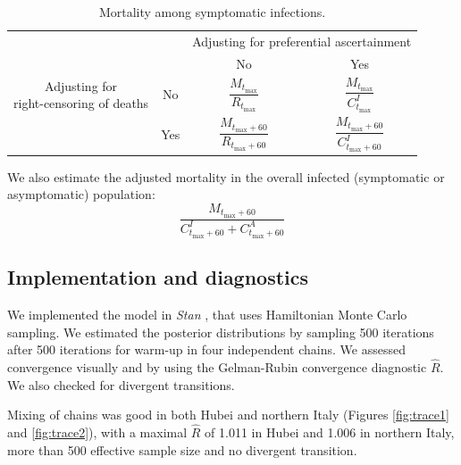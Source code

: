 \documentclass{article}
\begin{document}
\begin{table}[H]
		\centering
		\begin{tabular}{cc|cc}
			

		 & & \multicolumn{2}{c}{Adjusting for preferential ascertainment}\\
		 & & No & Yes \\[3pt]
		 \hline
		\multirowcell{3}{Adjusting for\\[2pt] right-censoring of deaths} & No & $\dfrac{ M_{t_{\text{max}}}}{ R_{t_{\text{max}}}}$ & $\dfrac{ M_{t_{\text{max}}}}{ C_{t_{\text{max}}}^{I}}$\\[20pt]
		& Yes & $\dfrac{ M_{t_{\text{max}}+60}}{ R_{t_{\text{max}}+60}}$ & $\dfrac{ M_{t_{\text{max}}+60}}{ C_{t_{\text{max}}+60}^{I}}$\\[10pt]

		\end{tabular}
		\caption{Mortality among symptomatic infections.}
		\label{tab_cfr}
\end{table}
We also estimate the adjusted mortality in the overall infected (symptomatic or asymptomatic) population:
\begin{equation}
\dfrac{ M_{t_{\text{max}}+60}}{ C_{t_{\text{max}}+60}^{I}+C_{t_{\text{max}}+60}^{A}}
\end{equation}	

\subsection{Implementation and diagnostics}
\label{diag}

We implemented the model in \textit{Stan} \cite{Carpenter2017}, that uses Hamiltonian Monte Carlo sampling.
We estimated the posterior distributions by sampling 500 iterations after 500 iterations for warm-up in four independent chains.
We assessed convergence visually and by using the Gelman-Rubin convergence diagnostic $\hat{R}$.
We also checked for divergent transitions.

Mixing of chains was good in both Hubei and northern Italy (Figures \ref{fig:trace1} and \ref{fig:trace2}), with a maximal $\hat{R}$ of 1.011 in Hubei and 1.006 in northern Italy, more than 500 effective sample size and no divergent transition.
	
\end{document}

